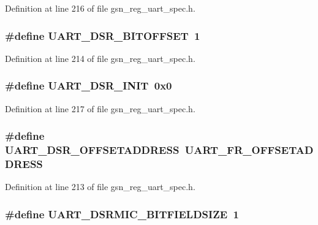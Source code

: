 Definition at line 216 of file gsn\_\-reg\_\-uart\_\-spec.h.

\hypertarget{a00575_a4fee9e385ead474e3f5753fea4b20188}{
\subsubsection[{UART\_\-DSR\_\-BITOFFSET}]{\setlength{\rightskip}{0pt plus 5cm}\#define UART\_\-DSR\_\-BITOFFSET~1}}
\label{a00575_a4fee9e385ead474e3f5753fea4b20188}


Definition at line 214 of file gsn\_\-reg\_\-uart\_\-spec.h.

\hypertarget{a00575_a71dc273fbf1d378acaeba01dac7a22f6}{
\subsubsection[{UART\_\-DSR\_\-INIT}]{\setlength{\rightskip}{0pt plus 5cm}\#define UART\_\-DSR\_\-INIT~0x0}}
\label{a00575_a71dc273fbf1d378acaeba01dac7a22f6}


Definition at line 217 of file gsn\_\-reg\_\-uart\_\-spec.h.

\hypertarget{a00575_ac301e851aed39ac511a61a236fca484e}{
\subsubsection[{UART\_\-DSR\_\-OFFSETADDRESS}]{\setlength{\rightskip}{0pt plus 5cm}\#define UART\_\-DSR\_\-OFFSETADDRESS~UART\_\-FR\_\-OFFSETADDRESS}}
\label{a00575_ac301e851aed39ac511a61a236fca484e}


Definition at line 213 of file gsn\_\-reg\_\-uart\_\-spec.h.

\hypertarget{a00575_a6367eca2edef1d8ebddca71cfdf21fee}{
\subsubsection[{UART\_\-DSRMIC\_\-BITFIELDSIZE}]{\setlength{\rightskip}{0pt plus 5cm}\#define UART\_\-DSRMIC\_\-BITFIELDSIZE~1}}
\label{a00575_a6367eca2edef1d8ebddca71cfdf21fee}


